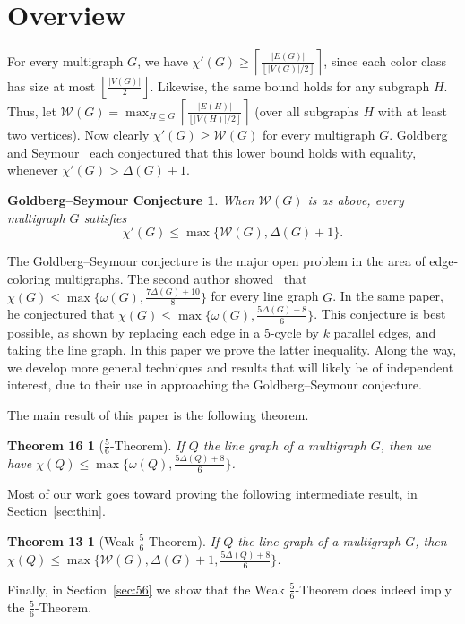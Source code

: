 \documentclass[12pt]{amsart}
\theoremstyle{plain}
\newtheorem*{GS}{Goldberg--Seymour Conjecture}
\newtheorem*{main}{Theorem 16}
\newtheorem*{main2}{Theorem 13}
\theoremstyle{definition}
\theoremstyle{remark}
\newcommand{\fancy}[1]{\mathcal{#1}}
\newcommand{\W}{\fancy{W}}
\newcommand{\ceil}[1]{\left\lceil#1\right\rceil}
\newcommand{\floor}[1]{\left\lfloor#1\right\rfloor}
\begin{document}
\section{Overview}

For every multigraph $G$, we have $\chi'(G)\ge
\ceil{\frac{|E(G)|}{\floor{|V(G)|/2}}}$, since each color class has size at most
$\floor{\frac{|V(G)|}2}$.  Likewise, the same bound holds for any subgraph $H$.  
Thus, let $\W(G)=\max_{H\subseteq G}\ceil{\frac{|E(H)|}{\floor{|V(H)|/2}}}$
(over all subgraphs $H$ with at least two vertices). Now 
clearly $\chi'(G)\ge \W(G)$ for every multigraph $G$.  Goldberg~\cite{} and
Seymour~\cite{} each conjectured that this lower bound holds with equality,
whenever $\chi'(G)>\Delta(G)+1$.
\begin{GS}
When $\W(G)$ %
is as above, 
every multigraph $G$ satisfies
\[
\chi'(G)\le\max\{\W(G), \Delta(G)+1\}.
\]
\end{GS}
The Goldberg--Seymour conjecture is the major open problem in the area of
edge-coloring multigraphs.
The second author showed~\cite{rabern2011strengthening} that $\chi(G)\le
\max\{\omega(G), \frac{7\Delta(G)+10}{8}\}$  for every line graph $G$.
In the same paper, he conjectured
that $\chi(G)\le \max\{\omega(G),\frac{5\Delta(G)+8}{6}\}$. This conjecture is best
possible, as shown by replacing each edge in a 5-cycle by $k$ parallel edges,
and taking the line graph.
In this paper we prove the latter inequality.  Along the way, we develop
more general techniques and results that will likely be of independent
interest, due to their use in approaching the Goldberg--Seymour conjecture.

The main result of this paper is the following theorem.
\begin{main}[$\frac56$-Theorem]
If $Q$ the line graph of a multigraph $G$, then 
we have $\chi(Q)\le \max\{\omega(Q),\frac{5\Delta(Q)+8}{6}\}$. 
\end{main}

Most of our work goes toward proving the following
intermediate result, in Section~\ref{sec:thin}.
\begin{main2}[Weak $\frac56$-Theorem]
If $Q$ the line graph of a multigraph $G$, then 
$\chi(Q)\le \max\{\W(G),\Delta(G)+1,\frac{5\Delta(Q)+8}{6}\}$. 
\end{main2}
Finally, in Section~\ref{sec:56} we show that the Weak $\frac56$-Theorem does indeed imply
the $\frac56$-Theorem.
\end{document}
